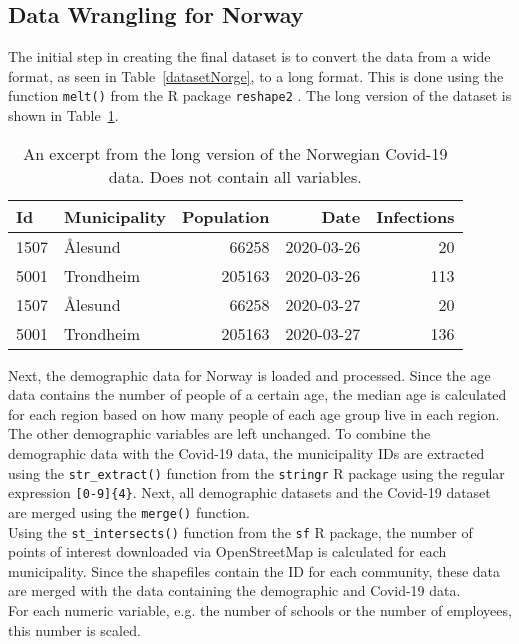 \subsection{Data Wrangling for Norway}
The initial step in creating the final dataset is to convert the data from a wide format, as seen in Table~\ref{datasetNorge}, to a long format. This is done using the function \texttt{melt()} from the R package \texttt{reshape2} \autocite[][]{reshape2}. The long version of the dataset is shown in Table~\ref{norwayLong}.
\begin{table}[H] 
\caption{An excerpt from the long version of the Norwegian Covid-19 data. Does not contain all variables.\label{norwayLong}}
\begin{tabular}{l l r r r}
\toprule
\textbf{Id}	& \textbf{Municipality}	& \textbf{Population} & \textbf{Date} & \textbf{Infections}\\
\midrule
1507 & Ålesund & 66258 & 2020-03-26 & 20\\
5001 & Trondheim  & 205163  & 2020-03-26 & 113\\
1507 & Ålesund & 66258 & 2020-03-27 & 20\\
5001 & Trondheim  & 205163  & 2020-03-27 & 136\\
\bottomrule
\end{tabular}
\end{table}
Next, the demographic data for Norway is loaded and processed. Since the age data contains the number of people of a certain age, the median age is calculated for each region based on how many people of each age group live in each region. \\
The other demographic variables are left unchanged. To combine the demographic data with the Covid-19 data, the municipality IDs are extracted using the \texttt{str\_extract()} function from the \texttt{stringr} \autocite[][]{stringr} R package using the regular expression \texttt{[0-9]\{4\}}. Next, all demographic datasets and the Covid-19 dataset are merged using the \texttt{merge()} function. \\
Using the \texttt{st\_intersects()} function from the \texttt{sf} \autocite[][]{sf} R package, the number of points of interest downloaded via OpenStreetMap is calculated for each municipality. Since the shapefiles contain the ID for each community, these data are merged with the data containing the demographic and Covid-19 data. \\
For each numeric variable, e.g. the number of schools or the number of employees, this number is scaled. \\

